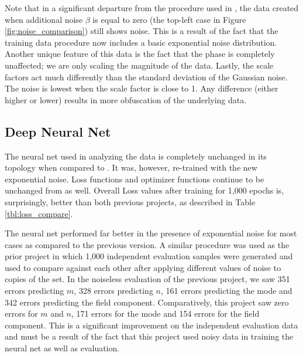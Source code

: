 \documentclass[conference]{IEEEtran}
\begin{document}
Note that in a significant departure from the procedure used in \cite{newberry_machine_2022-1}, the data created when additional noise $\beta$ is equal to zero (the top-left case in Figure \ref{fig:noise_comparison}) still shows noise. This is a result of the fact that the training data procedure now includes a basic exponential noise distribution. 
Another unique feature of this data is the fact that the phase is completely unaffected; we are only scaling the magnitude of the data.
Lastly, the scale factors act much differently than the standard deviation of the Gaussian noise. 
The noise is lowest when the scale factor is close to 1. 
Any difference (either higher or lower) results in more obfuscation of the underlying data.

\subsection{Deep Neural Net}

The neural net used in analyzing the data is completely unchanged in its topology when compared to \cite{newberry_machine_2022-1}.
It was, however, re-trained with the new exponential noise.
Loss functions and optimizer functions continue to be unchanged from \cite{newberry_machine_2022-1} as well.
Overall Loss values after training for 1,000 epochs is, surprisingly, better than both previous projects, as described in Table \ref{tbl:loss_compare}.

\begin{table}
	\centering
	\caption{Comparison of Overall Loss Values after Neural Net Training.}
	\setlength\extrarowheight{2pt}
	\label{tbl:loss_compare}
\end{table}

The neural net performed far better in the presence of exponential noise for most cases as compared to the previous version. 
A similar procedure was used as the prior project in which 1,000 independent evaluation samples were generated and used to compare against each other after applying different values of noise to copies of the set.
In the noiseless evaluation of the previous project, we saw 351 errors predicting $m$, 328 errors predicting $n$, 161 errors predicting the mode and 342 errors predicting the field component.
Comparatively, this project saw zero errors for $m$ and $n$, 171 errors for the mode and 154 errors for the field component. 
This is a significant improvement on the independent evaluation data and must be a result of the fact that this project used noisy data in training the neural net as well as evaluation.
\end{document}
